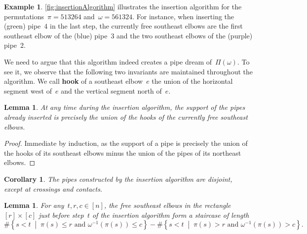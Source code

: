 \documentclass{amsart}
\newtheorem{corollary}[theorem]{Corollary}
\newtheorem{lemma}[theorem]{Lemma}
\theoremstyle{definition}
\newtheorem{example}[theorem]{Example}
\newcommand{\set}[2]{\left\{ #1 \;\middle|\; #2 \right\}} %
\newcommand{\defn}[1]{\textbf{\textsf{\color{PineGreen} #1}}} %
\newcommand{\pipeDreams}{\Pi} %
\begin{document}
\begin{example}
\label{exm:insertionAlgorithm}
\cref{fig:insertionAlgorithm} illustrates the insertion algorithm for the permutations~${\pi = 513264}$ and~${\omega = 561324}$.
For instance, when inserting the (green) pipe~$4$ in the last step, the currently free southeast elbows are the first southeast elbow of the (blue) pipe~$3$ and the two southeast elbows of the (purple) pipe~$2$.
\end{example}

We need to argue that this algorithm indeed creates a pipe dream of~$\pipeDreams(\omega)$.
To see it, we observe that the following two invariants are maintained throughout the algorithm.
We call \defn{hook} of a southeast elbow~$e$ the union of the horizontal segment west of~$e$ and the vertical segment north of~$e$.

\begin{lemma}
\label{lem:disjointPipesInsertionAlgorithm}
At any time during the insertion algorithm, the support of the pipes already inserted is precisely the union of the hooks of the currently free southeast elbows.
\end{lemma}

\begin{proof}
Immediate by induction, as the support of a pipe is precisely the union of the hooks of its southeast elbows minus the union of the pipes of its northeast elbows.
\end{proof}

\begin{corollary}
\label{coro:disjointPipesInsertionAlgorithm}
The pipes constructed by the insertion algorithm are disjoint, except at crossings and contacts.
\end{corollary}

\begin{lemma}
\label{lem:rectangleInsertionAlgorithm}
For any~$t, r, c \in [n]$, the free southeast elbows in the rectangle~$[r] \times [c]$ just before step~$t$ of the insertion algorithm form a staircase of length
\[
\# \set{s < t}{\pi(s) \le r \text{ and } \omega^{-1}(\pi(s)) \le c} - \# \set{s < t}{\pi(s) > r \text{ and } \omega^{-1}(\pi(s)) > c}.
\]
\end{lemma}
\end{document}
